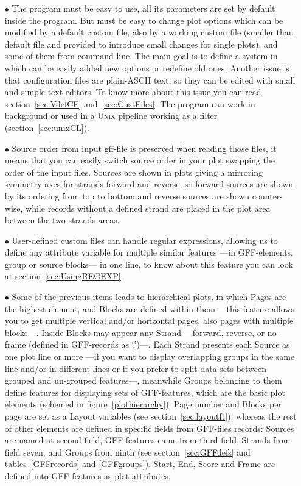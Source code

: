 \begin{itemize}
\item[$\bullet$] The program must be easy to use, all its parameters are set by default inside the program. But must be easy to change plot options which can be modified by a default custom file, also by a working custom file (smaller than default file and provided to introduce small changes for single plots), and some of them from command-line. The main goal is to define a system in which can be easily added new options or redefine old ones. Another issue is that configuration files are plain-ASCII text, so they can be edited with small and simple text editors. To know more about this issue you can read section~\ref{sec:VdefCF} and~\ref{sec:CustFiles}. The program can work in background or used in a \textsc{Unix} pipeline working as a filter (section~\ref{sec:unixCL}).
\item[$\bullet$] Source order from input gff-file is preserved when reading those files, it means that you can easily switch source order in your plot swapping the order of the input files. Sources are shown in plots giving a mirroring symmetry axes for strands forward and reverse, so forward sources are shown by its ordering from top to bottom and reverse sources are shown counter-wise, while records without a defined strand are placed in the plot area between the two strands areas.
\item[$\bullet$] User-defined custom files can handle regular expressions, allowing us to define any attribute variable for multiple similar features ---in GFF-elements, group or source blocks--- in one line, to know about this feature you can look at section~\ref{sec:UsingREGEXP}.
\item[$\bullet$] Some of the previous items leads to hierarchical plots, in which Pages are the highest element, and Blocks are defined within them ---this feature allows you to get multiple vertical and/or horizontal pages, also pages with multiple blocks---. Inside Blocks may appear any Strand ---forward, reverse, or no-frame (defined in GFF-records as `.')---. Each Strand presents each Source as one plot line or more ---if you want to display overlapping groups in the same line and/or in different lines or if you prefer to split data-sets between grouped and un-grouped features---, meanwhile Groups belonging to them define features for displaying sets of GFF-features, which are the basic plot elements (schemed in figure~\ref{plothierarchy}). Page number and Blocks per page are set as a Layout variables (see section~\ref{sec:layoutft}), whereas the rest of other elements are defined in specific fields from GFF-files records: Sources are named at second field, GFF-features came from third field, Strands from field seven, and Groups from ninth (see section~\ref{sec:GFFdefs} and tables~\ref{GFFrecords} and \ref{GFFgroups}). Start, End, Score and Frame are defined into GFF-features as plot attributes. 

\end{itemize}
